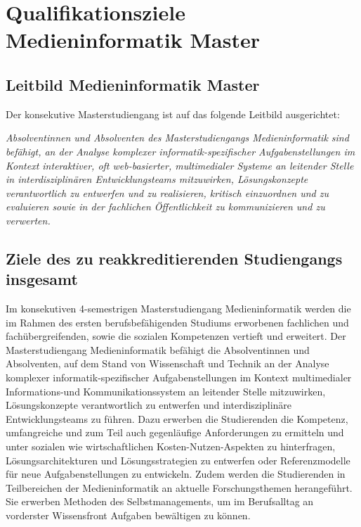 \section{Qualifikationsziele Medieninformatik
Master}\label{qualifikationsziele-medieninformatik-master}

\subsection{Leitbild Medieninformatik
Master}\label{leitbild-medieninformatik-master}

Der konsekutive Masterstudiengang ist auf das folgende Leitbild
ausgerichtet:

\emph{Absolventinnen und Absolventen des Masterstudiengangs
Medieninformatik sind befähigt, an der Analyse komplexer
informatik-spezifischer Aufgabenstellungen im Kontext interaktiver, oft
web-basierter, multimedialer Systeme an leitender Stelle in
interdisziplinären Entwicklungsteams mitzuwirken, Lösungskonzepte
verantwortlich zu entwerfen und zu realisieren, kritisch einzuordnen und
zu evaluieren sowie in der fachlichen Öffentlichkeit zu kommunizieren
und zu verwerten.}

\subsection{Ziele des zu reakkreditierenden Studiengangs
insgesamt}\label{ziele-des-zu-reakkreditierenden-studiengangs-insgesamt-1}

Im konsekutiven 4-semestrigen Masterstudiengang Medieninformatik werden
die im Rahmen des ersten berufsbefähigenden Studiums erworbenen
fachlichen und fachübergreifenden, sowie die sozialen Kompetenzen
vertieft und erweitert. Der Masterstudiengang Medieninformatik befähigt
die Absolventinnen und Absolventen, auf dem Stand von Wissenschaft und
Technik an der Analyse komplexer informatik-spezifischer
Aufgabenstellungen im Kontext multimedialer Informations-und
Kommunikationssystem an leitender Stelle mitzuwirken, Lösungskonzepte
verantwortlich zu entwerfen und interdisziplinäre Entwicklungsteams zu
führen. Dazu erwerben die Studierenden die Kompetenz, umfangreiche und
zum Teil auch gegenläufige Anforderungen zu ermitteln und unter sozialen
wie wirtschaftlichen Kosten-Nutzen-Aspekten zu hinterfragen,
Lösungsarchitekturen und Lösungsstrategien zu entwerfen oder
Referenzmodelle für neue Aufgabenstellungen zu entwickeln. Zudem werden
die Studierenden in Teilbereichen der Medieninformatik an aktuelle
Forschungsthemen herangeführt. Sie erwerben Methoden des
Selbstmanagements, um im Berufsalltag an vorderster Wissensfront
Aufgaben bewältigen zu können.

